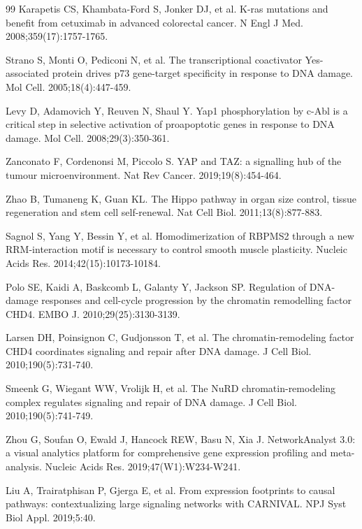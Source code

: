 \documentclass[11pt]{article}
\begin{document}
\begin{thebibliography}{99}
Karapetis CS, Khambata-Ford S, Jonker DJ, et al. K-ras mutations and benefit from cetuximab in advanced colorectal cancer. N Engl J Med. 2008;359(17):1757-1765.

Strano S, Monti O, Pediconi N, et al. The transcriptional coactivator Yes-associated protein drives p73 gene-target specificity in response to DNA damage. Mol Cell. 2005;18(4):447-459.

Levy D, Adamovich Y, Reuven N, Shaul Y. Yap1 phosphorylation by c-Abl is a critical step in selective activation of proapoptotic genes in response to DNA damage. Mol Cell. 2008;29(3):350-361.

Zanconato F, Cordenonsi M, Piccolo S. YAP and TAZ: a signalling hub of the tumour microenvironment. Nat Rev Cancer. 2019;19(8):454-464.

Zhao B, Tumaneng K, Guan KL. The Hippo pathway in organ size control, tissue regeneration and stem cell self-renewal. Nat Cell Biol. 2011;13(8):877-883.

Sagnol S, Yang Y, Bessin Y, et al. Homodimerization of RBPMS2 through a new RRM-interaction motif is necessary to control smooth muscle plasticity. Nucleic Acids Res. 2014;42(15):10173-10184.

Polo SE, Kaidi A, Baskcomb L, Galanty Y, Jackson SP. Regulation of DNA-damage responses and cell-cycle progression by the chromatin remodelling factor CHD4. EMBO J. 2010;29(25):3130-3139.

Larsen DH, Poinsignon C, Gudjonsson T, et al. The chromatin-remodeling factor CHD4 coordinates signaling and repair after DNA damage. J Cell Biol. 2010;190(5):731-740.

Smeenk G, Wiegant WW, Vrolijk H, et al. The NuRD chromatin-remodeling complex regulates signaling and repair of DNA damage. J Cell Biol. 2010;190(5):741-749.

Zhou G, Soufan O, Ewald J, Hancock REW, Basu N, Xia J. NetworkAnalyst 3.0: a visual analytics platform for comprehensive gene expression profiling and meta-analysis. Nucleic Acids Res. 2019;47(W1):W234-W241.

Liu A, Trairatphisan P, Gjerga E, et al. From expression footprints to causal pathways: contextualizing large signaling networks with CARNIVAL. NPJ Syst Biol Appl. 2019;5:40.

\end{thebibliography}
\end{document}
